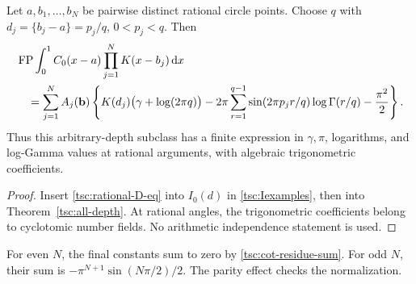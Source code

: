 \begin{theorem}\label{tsc:rational}
Let $a,b_1,\ldots,b_N$ be pairwise distinct rational circle points. Choose
$q$ with $d_j=\{b_j-a\}=p_j/q$, $0<p_j<q$. Then
\begin{align}\label{tsc:all-depth-gamma}
 &\operatorname{FP}\int_0^1 C_0(x-a)\prod_{j=1}^NK(x-b_j)\,\mathrm d x\notag\\
 &\quad=\sum_{j=1}^N A_j(\mathbf b)
   \left\{K(d_j)\bigl(\gamma+\log(2\pi q)\bigr)
      -2\pi\sum_{r=1}^{q-1}\sin(2\pi p_jr/q)\log\Gamma(r/q)
      -\frac{\pi^2}{2}\right\}.
\end{align}
Thus this arbitrary-depth subclass has a finite expression in
$\gamma,\pi$, logarithms, and log-Gamma values at rational arguments,
with algebraic trigonometric coefficients.
\end{theorem}
\begin{proof}
Insert \eqref{tsc:rational-D-eq} into $I_0(d)$ in
\eqref{tsc:Iexamples}, then into Theorem~\ref{tsc:all-depth}.
At rational angles, the trigonometric coefficients belong to cyclotomic
number fields. No arithmetic independence statement is used.
\end{proof}
For even $N$, the final constants sum to zero by
\eqref{tsc:cot-residue-sum}. For odd $N$, their sum is
$-\pi^{N+1}\sin(N\pi/2)/2$. The parity effect checks the normalization.

